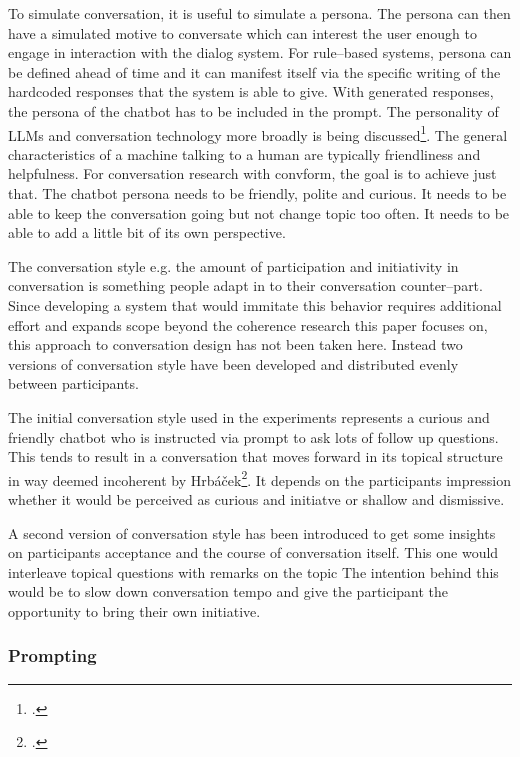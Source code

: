 \documentclass[12pt]{report}
\begin{document}
{To simulate conversation, it is useful to simulate a persona.
The persona can then have a simulated motive to conversate
which can interest the user enough to engage in interaction with the dialog system.
For rule–based systems, persona can be defined ahead of time
and it can manifest itself via the specific writing of the hardcoded responses
that the system is able to give.
With generated responses, the persona of the chatbot has to be included in the prompt.
The personality of LLMs and conversation technology more broadly
is being discussed\footcite{gpttoxicity, robopersona}.
The general characteristics of a machine talking to a human are typically
friendliness and helpfulness.
For conversation research with convform,
the goal is to achieve just that.
The chatbot persona needs to be friendly,
polite and curious.
It needs to be able to keep the conversation going
but not change topic too often.
It needs to be able to add a little bit of its own perspective.
\par
The conversation style e.g. the amount of participation and initiativity in conversation
is something people adapt in to their conversation counter–part.
Since developing a system that would immitate this behavior
requires additional effort
and expands scope beyond the coherence research
this paper focuses on,
this approach to conversation design
has not been taken here.
Instead two versions of conversation style
have been developed
and distributed evenly between participants.

\par
The initial conversation style used in the experiments
represents a curious and friendly chatbot
who is instructed via prompt to ask lots of follow up questions.
This tends to result in a conversation that moves forward in its topical structure
in way deemed incoherent by Hrbáček\footcite[p.~30]{hrbacek1994}.
It depends on the participants impression whether it would be perceived as
curious and initiatve or shallow and dismissive.

\par
A second version of conversation style has been introduced
to get some insights on participants acceptance and
the course of conversation itself.
This one would interleave topical questions with remarks on the topic
The intention behind this would be to slow down conversation tempo
and give the participant the opportunity to bring their own initiative.

\subsubsection{Prompting}

}
\end{document}
